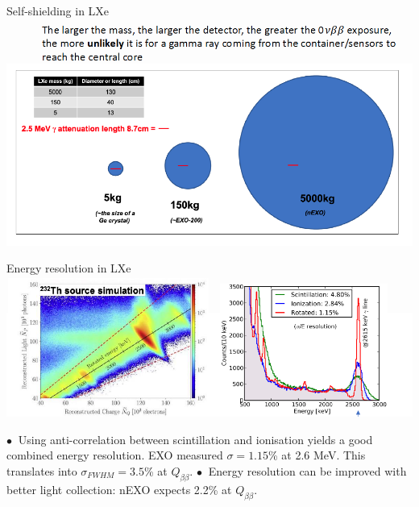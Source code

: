 \documentclass [aspectratio=169]{beamer}
\newcommand{\qbb}{\ensuremath{Q_{\beta\beta}}}
\begin{document}
\begin{frame}{Self-shielding in LXe}
\includegraphics[scale=0.35]{self-shielding-lxe.png}
\end{frame}


\begin{frame}{Energy resolution in LXe}
\includegraphics[scale=0.35]{scintioniexo.png}


$\bullet~$ Using anti-correlation between scintillation and ionisation yields a good combined energy resolution. EXO measured $\sigma = 1.15$\% at 2.6 MeV. This translates into  
$\sigma_{FWHM} = 3.5$\% at \qbb.  
$\bullet~$ Energy resolution can be improved with better light collection: nEXO expects 2.2\% at \qbb. 

\end{frame}
\end{document}
